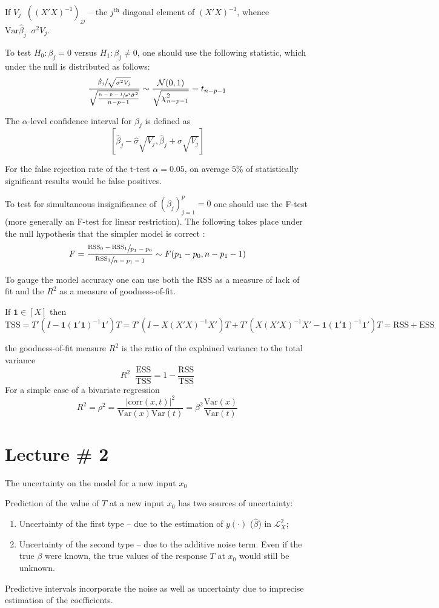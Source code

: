 \documentclass[a4paper]{article}
\newcommand{\clo}[1]{{\left [ #1 \right ]}}
\newcommand{\brac}[1]{{\left ( #1 \right )}}
\newcommand{\abs}[1]{{\left | #1 \right |}}
\newcommand{\Ncal}{\mathcal{N}}
\newcommand{\Lcal}{\mathcal{L}}
\newcommand{\Var}[0]{{\text{Var}}}
\newcommand{\RSS}{{\text{RSS}}}
\newcommand{\one}{\mathbf{1}}
\newcommand{\defn}{\mathop{\overset{\Delta}{=}}\nolimits}
\begin{document}
If $V_j \defn \brac{\brac{X'X}^{-1}}_{jj}$ -- the $j^\text{th}$ diagonal element of $\brac{X'X}^{-1}$,
whence $\Var\hat{\beta}_j\defn \sigma^2 V_j$.

To test $H_0:\beta_j=0$ versus $H_1:\beta_j\neq 0$, one should use the following statistic, which under the null is distributed as follows:
\[\frac{\sfrac{\hat{\beta}_j}{\sqrt{\sigma^2 V_j}}}{\sqrt{ \frac{\sfrac{n-p-1}{\sigma^2} \hat{\sigma}^2 }{ n-p-1 } }} \sim \frac{\Ncal(0, 1)}{\sqrt{\chi^2_{n-p-1}}} = t_{n-p-1}\]

The $\alpha$-level confidence interval for $\beta_j$ is defined as
\[\clo{ \hat{\beta}_j - \hat{\sigma} \sqrt{ V_j },  \hat{\beta}_j + \hat{\sigma} \sqrt{ V_j } }\]

For the false rejection rate of the t-test $\alpha = 0.05$, on average $5\%$ of statistically significant results would be false positives.

To test for simultaneous insignificance of $\brac{\beta_j}_{j=1}^p = 0$ one should use the F-test
(more generally an F-test for linear restriction). The following takes place under the null hypothesis that the simpler model is correct :
\[F = \frac{\sfrac{\RSS_0-\RSS_1}{p_1-p_0}}{\sfrac{\RSS_1}{n-p_1-1}}\sim F(p_1-p_0, n-p_1-1)\]

To gauge the model accuracy one can use both the RSS as a measure of lack of fit and the $R^2$ as a measure of goodness-of-fit.

If $\one\in \clo{X}$ then
\[ \text{TSS} = T' \brac{I - \one\brac{\one'\one}^{-1}\one'} T = T' \brac{I - X\brac{X'X}^{-1}X'} T + T' \brac{ X\brac{X'X}^{-1}X' - \one\brac{\one'\one}^{-1}\one'} T = \RSS + \text{ESS}\]

the goodness-of-fit measure $R^2$ is the ratio of the explained variance to the total variance
\[R^2 \defn \frac{\text{ESS}}{\text{TSS}} = 1 - \frac{\RSS}{\text{TSS}} \]
For a simple case of a bivariate regression
\[R^2 = \rho^2 = \frac{\abs{\text{corr}(x,t)}^2}{\Var(x)\Var(t)} = \beta^2 \frac{\Var(x)}{\Var(t)}\]




\section{Lecture \# 2} %
\label{sec:lecture_2}

The uncertainty on the model for a new input $x_0$ 

Prediction of the value of $T$ at a new input $x_0$ has two sources of uncertainty: \begin{enumerate}
	\item Uncertainty of the first type -- due to the estimation of $y(\cdot)$ ($\hat{\beta}$) in $\Lcal^2_X$;
	\item Uncertainty of the second type -- due to the additive noise term. Even if the true $\beta$ were known, the true values of the response $T$ at $x_0$ would still be unknown.
\end{enumerate}
Predictive intervals incorporate the noise as well as uncertainty due to imprecise estimation of the coefficients.
\end{document}
